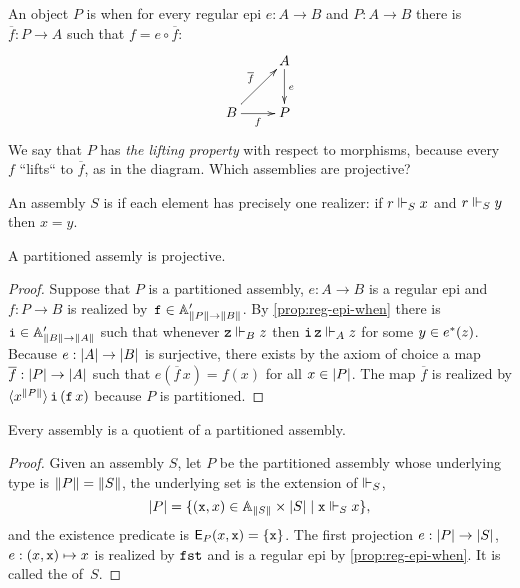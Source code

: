 An object $P$ is  when for every regular epi $e : A \to B$ and $P : A \to B$ there is $\overline{f} : P \to A$ such that $f = e \circ \overline{f}$:
%
\begin{equation*}
  \xymatrix{
    &
    {A}
    \ar[d]^{e}
    \\
    {B}
    \ar[r]_{f}
    \ar[ru]^{\overline{f}}
    &
    {P}
  }
\end{equation*}
%
We say that $P$ has \emph{the lifting property} with respect to morphisms, because every~$f$ ``lifts`` to $\overline{f}$, as in the diagram.  Which assemblies are projective?

\begin{definition}
  An assembly $S$ is  if each element has precisely one realizer:
  if $r \rz[S] x$ and $r \rz[S] y$ then $x = y$.
\end{definition}

\begin{proposition}
  \label{prop:partitioned-projective}
  A partitioned assemly is projective.
\end{proposition}

\begin{proof}
  Suppose that $P$ is a partitioned assembly, $e : A \to B$ is a regular epi and $f : P \to B$ is realized by~$\R{f} \in \subAtyp{\T{P} \to \T{B}}$.
  By \cref{prop:reg-epi-when} there is $\R{i} \in \subAtyp{\T{B} \to \T{A}}$ such that whenever $\R{z} \rz[B] z$ then $\R{i}\,\R{z} \rz[A] z$ for some $y \in \invim{e}(z)$.
  Because $e : \S{A} \to \S{B}$ is surjective, there exists by the axiom of choice a map $\overline{f} : \S{P} \to \S{A}$ such that $e(\overline{f}\, x) = f(x)$ for all $x \in \S{P}$. The map $\overline{f}$ is realized by $\tpcalam{x}{\T{P}} \R{i}\,(\R{f}\,x)$ because $P$ is partitioned.
\end{proof}

\begin{proposition}
  \label{prop:partitioned-covers}
  Every assembly is a quotient of a partitioned assembly.
\end{proposition}

\begin{proof}
  Given an assembly $S$, let $P$ be the partitioned assembly whose underlying type is $\T{P} = \T{S}$, the underlying set is the extension of $\rz[S]$,
  \begin{equation*}
    \S{P} = \set{ (\R{x}, x) \in \Atyp{\T{S}} \times \S{S} \such \R{x} \rz[S] x},
  \end{equation*}
  and the existence predicate is $\Ex{P}(x, \R{x}) = \set{\R{x}}$.
  The first projection $e : \S{P} \to \S{S}$, $e : (x, \R{x}) \mapsto x$ is realized by $\combFst$ and is a regular epi by \cref{prop:reg-epi-when}.
  It is called the  of~$S$.
\end{proof}



